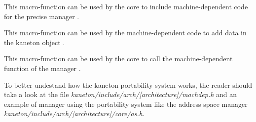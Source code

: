 	 {
	   This macro-function can be used by the core to include
	   machine-dependent code for the precise manager .
	 }

	 {
	   This macro-function can be used by the machine-dependent code
	   to add data in the kaneton object .
	 }

	 {
	   This macro-function can be used by the core to call the
	   machine-dependent function  of the manager
	   .
	 }

To better undestand how the kaneton portability system works, the reader
should take a look at the file
\textit{kaneton/include/arch/[architecture]/machdep.h}
and an example of manager using the portability system like the address
space manager
\textit{kaneton/include/arch/[architecture]/core/as.h}.
